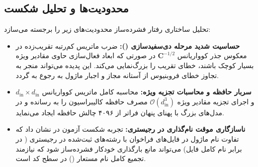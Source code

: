 \subsection{محدودیت‌ها و تحلیل شکست}
تحلیل ساختاری رفتار فشرده‌ساز  محدودیت‌های زیر را برجسته می‌سازد:
\begin{itemize}
    \item \textbf{حساسیت شدید مرحله دی‌سفیدسازی ():} ضرب ماتریس کم‌رتبه تقریب‌زده در معکوس جذر کوواریانس $\mathbf{C}^{-1/2}$ در صورتی که ابعاد فعال‌سازی حاوی مقادیر ویژه بسیار کوچک باشند، خطای تقریب را بزرگ‌نمایی می‌کند. این پدیده می‌تواند منجر به تجاوز خطای فروبنیوس از آستانه مجاز و اجبار ماژول به رجوع به  گردد.
    \item \textbf{سربار حافظه و محاسبات تجزیه ویژه:} محاسبه کامل ماتریس کوواریانس $d_{\text{in}} \times d_{\text{in}}$ و اجرای تجزیه مقادیر ویژه $\mathcal{O}(d_{\text{in}}^3)$ مصرف حافظه کالیبراسیون را به  رسانده و در مدل‌های بزرگ با پهنای پنهان فراتر از ۴۰۹۶ چالش حافظه ایجاد می‌نماید.
    \item \textbf{ناسازگاری موقت نام‌گذاری در رجیستری:} تجربه شکست آزمون در  نشان داد که تفاوت نام ماژول در فایل‌های فراخوان با رشته‌های ثبت‌شده در رجیستری ( در برابر نام کامل فایل) می‌تواند مانع بارگذاری خودکار فشرده‌ساز شود که نیازمند تجمیع کامل نام مستعار () در سطح کد است.
\end{itemize}
